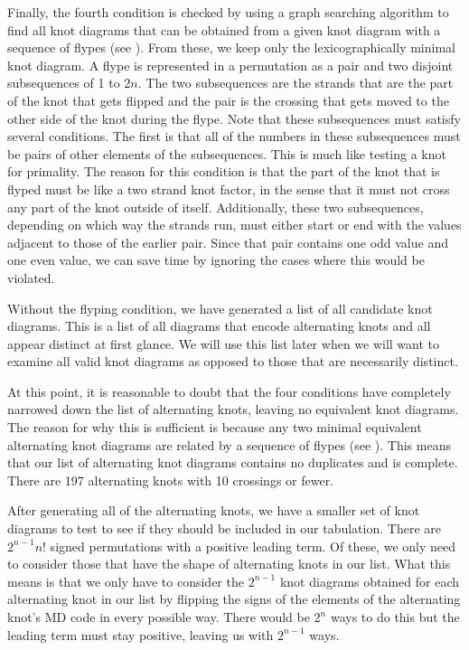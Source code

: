 \begin{paper}

Finally, the fourth condition is checked by using a graph searching algorithm to
find all knot diagrams that can be obtained from a given knot diagram with a
sequence of flypes (see \figMoves).
From these, we keep only the lexicographically minimal knot diagram.
A flype is represented in a permutation as a pair and two disjoint subsequences
of 1 to $2n$.
The two subsequences are the strands that are the part of the knot that gets
flipped and the pair is the crossing that gets moved to the other side of the
knot during the flype.
Note that these subsequences must satisfy several conditions.
The first is that all of the numbers in these subsequences must be pairs of
other elements of the subsequences.
This is much like testing a knot for primality.
The reason for this condition is that the part of the knot that is flyped must
be like a two strand knot factor, in the sense that it must not cross any part
of the knot outside of itself.
Additionally, these two subsequences, depending on which way the strands run,
must either start or end with the values adjacent to those of the earlier pair.
Since that pair contains one odd value and one even value, we can save time by
ignoring the cases where this would be violated.


Without the flyping condition, we have generated a list of all candidate knot
diagrams.
This is a list of all diagrams that encode alternating knots and all appear
distinct at first glance.
We will use this list later when we will want to examine all valid knot diagrams
as opposed to those that are necessarily distinct.


At this point, it is reasonable to doubt that the four conditions have
completely narrowed down the list of alternating knots, leaving no equivalent
knot diagrams.
The reason for why this is sufficient is because any two minimal equivalent
alternating knot diagrams are related by a sequence of flypes (see
\cite{flype}).
This means that our list of alternating knot diagrams contains no duplicates and
is complete.
There are 197 alternating knots with 10 crossings or fewer.



After generating all of the alternating knots, we have a smaller set of knot
diagrams to test to see if they should be included in our tabulation.
There are $2^{n-1}n!$ signed permutations with a positive leading term.
Of these, we only need to consider those that have the shape of alternating
knots in our list.
What this means is that we only have to consider the $2^{n-1}$ knot diagrams
obtained for each alternating knot in our list by flipping the signs of the
elements of the alternating knot's MD code in every possible way.
There would be $2^n$ ways to do this but the leading term must stay positive,
leaving us with $2^{n-1}$ ways.


\end{paper}
